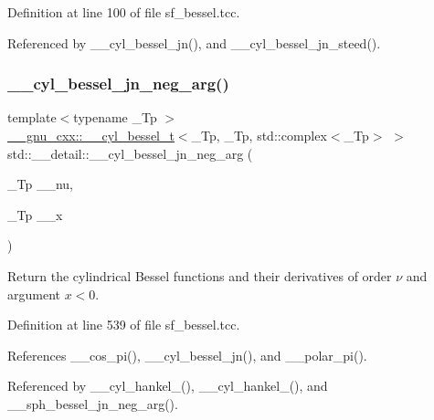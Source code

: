 Definition at line 100 of file sf\+\_\+bessel.\+tcc.



Referenced by \+\_\+\+\_\+cyl\+\_\+bessel\+\_\+jn(), and \+\_\+\+\_\+cyl\+\_\+bessel\+\_\+jn\+\_\+steed().

\mbox{\label{namespacestd_1_1____detail_a82d890270a5a8697d4af64c390b4b0e4}} 
\subsubsection{\texorpdfstring{\+\_\+\+\_\+cyl\+\_\+bessel\+\_\+jn\+\_\+neg\+\_\+arg()}{\_\_cyl\_bessel\_jn\_neg\_arg()}}
{\footnotesize\ttfamily template$<$typename \+\_\+\+Tp $>$ \\
\hyperlink{struct____gnu__cxx_1_1____cyl__bessel__t}{\+\_\+\+\_\+gnu\+\_\+cxx\+::\+\_\+\+\_\+cyl\+\_\+bessel\+\_\+t}$<$\+\_\+\+Tp, \+\_\+\+Tp, std\+::complex$<$\+\_\+\+Tp$>$ $>$ std\+::\+\_\+\+\_\+detail\+::\+\_\+\+\_\+cyl\+\_\+bessel\+\_\+jn\+\_\+neg\+\_\+arg (\begin{DoxyParamCaption}\item[{\+\_\+\+Tp}]{\+\_\+\+\_\+nu,  }\item[{\+\_\+\+Tp}]{\+\_\+\+\_\+x }\end{DoxyParamCaption})}



Return the cylindrical Bessel functions and their derivatives of order $ \nu $ and argument $ x < 0 $. 



Definition at line 539 of file sf\+\_\+bessel.\+tcc.



References \+\_\+\+\_\+cos\+\_\+pi(), \+\_\+\+\_\+cyl\+\_\+bessel\+\_\+jn(), and \+\_\+\+\_\+polar\+\_\+pi().



Referenced by \+\_\+\+\_\+cyl\+\_\+hankel\+\_(), \+\_\+\+\_\+cyl\+\_\+hankel\+\_(), and \+\_\+\+\_\+sph\+\_\+bessel\+\_\+jn\+\_\+neg\+\_\+arg().

\mbox{\label{namespacestd_1_1____detail_a92e231f659735cf87c67a35f5ac4dd36}} 

